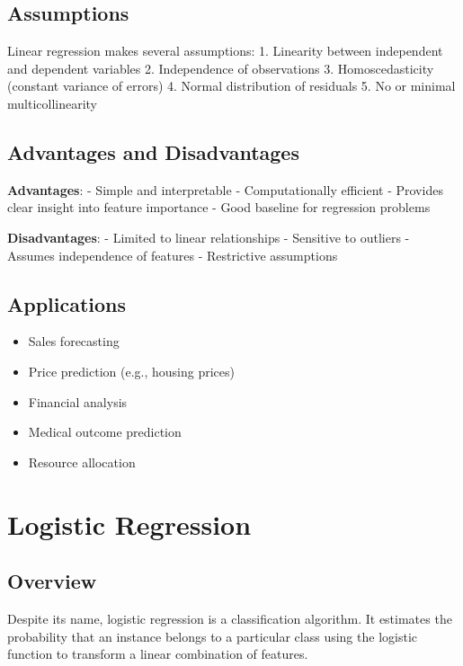 \documentclass[
  letterpaper,
  DIV=11,
  numbers=noendperiod]{scrreprt}
\providecommand{\tightlist}{%
  \setlength{\itemsep}{0pt}\setlength{\parskip}{0pt}}\usepackage{longtable,booktabs,array}
\begin{document}
\subsection{Assumptions}\label{assumptions}

Linear regression makes several assumptions: 1. Linearity between
independent and dependent variables 2. Independence of observations 3.
Homoscedasticity (constant variance of errors) 4. Normal distribution of
residuals 5. No or minimal multicollinearity

\subsection{Advantages and
Disadvantages}\label{advantages-and-disadvantages-1}

\textbf{Advantages}: - Simple and interpretable - Computationally
efficient - Provides clear insight into feature importance - Good
baseline for regression problems

\textbf{Disadvantages}: - Limited to linear relationships - Sensitive to
outliers - Assumes independence of features - Restrictive assumptions

\subsection{Applications}\label{applications-2}

\begin{itemize}
\tightlist
\item
  Sales forecasting
\item
  Price prediction (e.g., housing prices)
\item
  Financial analysis
\item
  Medical outcome prediction
\item
  Resource allocation
\end{itemize}

\section{Logistic Regression}\label{logistic-regression}

\subsection{Overview}\label{overview-2}

Despite its name, logistic regression is a classification algorithm. It
estimates the probability that an instance belongs to a particular class
using the logistic function to transform a linear combination of
features.
\end{document}
